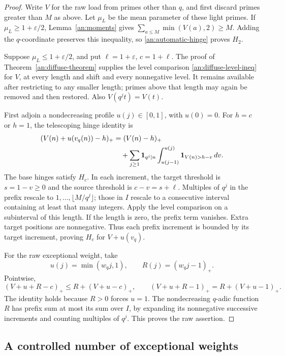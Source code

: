 \begin{proof}
Write \(V\) for the raw load from primes other than \(q\), and first
discard primes greater than \(M\) as above. Let \(\mu_L\) be the mean
parameter of these light primes. If \(\mu_L\ge1+\varepsilon/2\),
Lemma~\ref{an:moments} gives
\(\sum_{a\le M}\min(V(a),2)\ge M\). Adding the \(q\)-coordinate
preserves this inequality, so \eqref{an:automatic-hinge} proves \(H_2\).

Suppose \(\mu_L\le1+\varepsilon/2\), and put
\(\ell=1+\varepsilon\), \(c=1+\ell\). The proof of
Theorem~\ref{an:diffuse-theorem} supplies the level comparison
\eqref{an:diffuse-level-ineq} for \(V\), at every length and shift and
every nonnegative level. It remains available after restricting to any
smaller length; primes above that length may again be removed and then
restored. Also \(V(q^jt)=V(t)\).

First adjoin a nondecreasing profile \(u(j)\in[0,1]\), with \(u(0)=0\).
For \(h=c\) or \(h=1\), the telescoping hinge identity is
\begin{align}
 (V(n)+u(v_q(n))-h)_+
 &= (V(n)-h)_+ \notag\\
 &\quad+\sum_{j\ge1}\mathbf1_{q^j\mid n}
   \int_{u(j-1)}^{u(j)}\mathbf1_{V(n)>h-v}\,dv.
 \label{an:one-heavy-increments}
\end{align}
The base hinges satisfy \(H_c\). In each increment, the target threshold
is \(s=1-v\ge0\) and the source threshold is \(c-v=s+\ell\).
Multiples of \(q^j\) in the prefix rescale to
\(1,\ldots,\lfloor M/q^j\rfloor\); those in \(I\) rescale to a
consecutive interval containing at least that many integers. Apply the
level comparison on a subinterval of this length. If the length is zero,
the prefix term vanishes. Extra target positions are nonnegative.
Thus each prefix increment is bounded by its target increment, proving
\(H_c\) for \(V+u(v_q)\).

For the raw exceptional weight, take
\[
 u(j)=\min(w_qj,1),\qquad R(j)=(w_qj-1)_+.
\]
Pointwise,
\[
 (V+u+R-c)_+\le R+(V+u-c)_+,
 \qquad
 (V+u+R-1)_+=R+(V+u-1)_+.
\]
The identity holds because \(R>0\) forces \(u=1\). The nondecreasing
\(q\)-adic function \(R\) has prefix sum at most its sum over \(I\),
by expanding its nonnegative successive increments and counting
multiples of \(q^j\). This proves the raw assertion.
\end{proof}

\subsection{A controlled number of exceptional weights}

